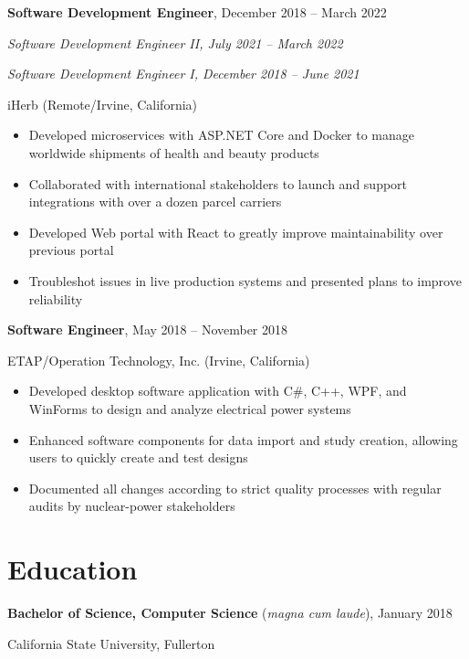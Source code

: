 \documentclass[11pt]{article}
\newcommand{\titleheader}[2]{\textbf{#1}, #2}
\newcommand{\titleextraheader}[3]{\textbf{#1} (#3), #2}
\newcommand{\secondaryheader}[1]{\hspace{2.25em} \textit{#1}}
\newcommand{\locheader}[2]{#1 (#2)}
\newcommand{\instheader}[1]{#1}
\begin{document}
	\titleheader{Software Development Engineer}{December 2018 -- March 2022}

	\secondaryheader{Software Development Engineer II, July 2021 -- March 2022}

	\secondaryheader{Software Development Engineer I, December 2018 -- June 2021}

	\locheader{iHerb}{Remote/Irvine, California}

	\begin{itemize}
		\item Developed microservices with ASP.NET Core and Docker to manage worldwide shipments of health and beauty products
		\item Collaborated with international stakeholders to launch and support integrations with over a dozen parcel carriers
		\item Developed Web portal with React to greatly improve maintainability over previous portal
		\item Troubleshot issues in live production systems and presented plans to improve reliability
	\end{itemize}

	\titleheader{Software Engineer}{May 2018 -- November 2018}

	\locheader{ETAP/Operation Technology, Inc.}{Irvine, California}

	\begin{itemize}
		\item Developed desktop software application with C\#, C++, WPF, and WinForms to design and analyze electrical power systems
		\item Enhanced software components for data import and study creation, allowing users to quickly create and test designs
		\item Documented all changes according to strict quality processes with regular audits by nuclear-power stakeholders
	\end{itemize}

	\section*{Education}

	\titleextraheader{Bachelor of Science, Computer Science}{January 2018}{\textit{magna cum laude}}

	\instheader{California State University, Fullerton}
\end{document}
